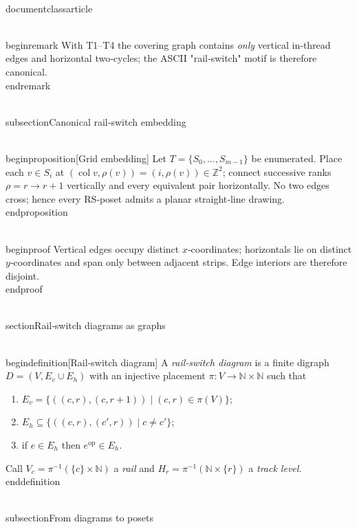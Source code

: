 \\documentclass{article}
\begin{document}
\\begin{remark}
With T1--T4 the covering graph contains \emph{only} vertical in‑thread
edges and horizontal two‑cycles; the ASCII "rail‑switch" motif is
therefore canonical.
\\end{remark}

\\subsection{Canonical rail‑switch embedding}

\\begin{proposition}[Grid embedding]\label{prop:grid}
Let $T=\{S_0,\dots,S_{m-1}\}$ be enumerated.  Place each
$v\in S_i$ at $(\operatorname{col}v,\rho(v))=(i,\rho(v))\in\mathbb Z^2$;
connect successive ranks $\rho= r\to r{+}1$ vertically and every
equivalent pair horizontally.  No two edges cross; hence every
RS‑poset admits a planar straight‑line drawing.
\\end{proposition}

\\begin{proof}
Vertical edges occupy distinct $x$‑coordinates; horizontals lie on
distinct $y$‑coordinates and span only between adjacent strips.  Edge
interiors are therefore disjoint.
\\end{proof}

\\section{Rail‑switch diagrams as graphs}

\\begin{definition}[Rail‑switch diagram]\label{def:RSD}
A \emph{rail‑switch diagram} is a finite digraph $D=(V,E_v\cup E_h)$
with an injective placement $\pi:V\to\mathbb N\times\mathbb N$ such
that
\begin{enumerate}[label=\textbf{R\arabic*}, wide]
  \item\label{ax:r1} $E_v=\{((c,r),(c,r{+}1))\mid(c,r)\in\pi(V)\}$;
  \item\label{ax:r2} $E_h\subseteq\{((c,r),(c',r))\mid c\neq c'\}$;
  \item\label{ax:r3} if $e\in E_h$ then $e^{\mathrm{op}}\in E_h$.
\end{enumerate}
Call $V_c=\pi^{-1}(\{c\}\times\mathbb N)$ a \emph{rail} and
$H_r=\pi^{-1}(\mathbb N\times\{r\})$ a \emph{track level}.
\\end{definition}

\\subsection{From diagrams to posets}
\end{document}
